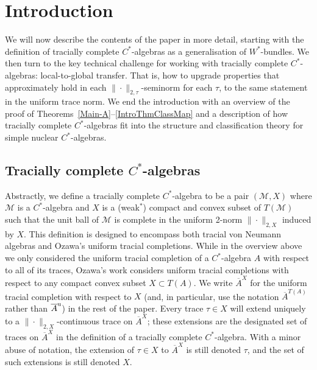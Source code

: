 \documentclass[a4paper,11pt]{amsart}
\theoremstyle{definition}
\numberwithin{equation}{section}
\numberwithin{theorem}{section}
\newcommand{\completion}[2]{\overline{#1}^{#2}}
\begin{document}
\section{Introduction}

We will now describe the contents of the paper in more detail, starting with the definition of tracially complete $C^*$-algebras as a generalisation of $W^*$-bundles. We then turn to the key technical challenge for working with tracially complete $C^*$-algebras: local-to-global transfer. That is, how to upgrade properties that approximately hold in each $\|\cdot\|_{2,\tau}$-seminorm for each $\tau$, to the same statement in the uniform trace norm. We end the introduction with an overview of the proof of Theorems~\ref{Main-A}--\ref{IntroThmClassMap} and a description of how tracially complete $C^*$-algebras fit into the structure and classification theory for simple nuclear $C^*$-algebras.

\subsection{Tracially complete \texorpdfstring{$C^*$}{C*}-algebras}

Abstractly, we define a tracially complete $C^*$-algebra to be a pair $(\mathcal M,X)$ where $\mathcal M$ is a $C^*$-algebra and $X$ is a (weak$^*$) compact and convex subset of $T(\mathcal M)$ such that the unit ball of $\mathcal M$ is complete in the uniform 2-norm $\|\cdot\|_{2,X}$ induced by $X$.  This definition is designed to encompass both tracial von Neumann algebras and Ozawa's uniform tracial completions.  While in the overview above we only considered the uniform tracial completion of a $C^*$-algebra $A$ with respect to all of its traces, Ozawa's work considers uniform tracial completions with respect to any compact convex subset $X\subset T(A)$.  We write $\completion{A}{X}$ for the uniform tracial completion with respect to $X$ (and, in particular, use the notation $\completion{A}{T(A)}$ rather than $\completion{A}{\rm u}$) in the rest of the paper. Every trace $\tau\in X$ will extend uniquely to a $\|\cdot\|_{2,X}$-continuous trace on $\completion{A}{X}$; these extensions are the designated set of traces on $\completion{A}{X}$ in the definition of a tracially complete $C^*$-algebra.  With a minor abuse of notation, the extension of $\tau \in X$ to $\completion{A}{X}$ is still denoted $\tau$, and the set of such extensions is still denoted $X$.  
\end{document}

